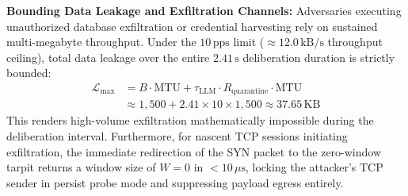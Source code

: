 \documentclass[journal]{IEEEtran}
\renewcommand{\_}{\textunderscore\allowbreak}
\begin{document}
\textbf{Bounding Data Leakage and Exfiltration Channels:}
Adversaries executing unauthorized database exfiltration or credential harvesting rely on sustained multi-megabyte throughput. Under the $10\,\text{pps}$ limit ($\approx 12.0\,\text{kB/s}$ throughput ceiling), total data leakage over the entire $2.41\,\text{s}$ deliberation duration is strictly bounded:
\begin{equation}
\begin{split}
  \mathcal{L}_{\text{max}} &= B \cdot \text{MTU} + \tau_{\text{LLM}} \cdot R_{\text{quarantine}} \cdot \text{MTU} \\
  &\approx 1{,}500 + 2.41 \times 10 \times 1{,}500 \approx 37.65\,\text{KB}
\end{split}
\label{eq:leakage_bound}
\end{equation}
This renders high-volume exfiltration mathematically impossible during the deliberation interval. Furthermore, for nascent TCP sessions initiating exfiltration, the immediate redirection of the SYN packet to the zero-window tarpit returns a window size of $W=0$ in $< 10\,\mu\text{s}$, locking the attacker's TCP sender in persist probe mode and suppressing payload egress entirely.
\end{document}
